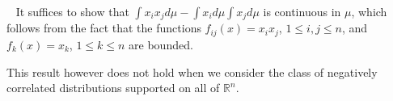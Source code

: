 \documentclass[11pt]{article}
\newcommand{\R}{\mathbb{R}}
\newenvironment{Proof}{\noindent{\bf Proof} \ }{\QED}\smallskip
\newcommand\QED{\newline \rightline{$\blacksquare$} \bigskip}
\begin{document}
\begin{Proof}
It suffices to show that $\int x_ix_j d\mu-\int x_i d\mu\int x_jd\mu$ is continuous in $\mu$, which follows from the fact that the functions $f_{ij}(x) = x_ix_j$, $1\leq i,j\leq n$,
and $f_k(x) = x_k$, $1\leq k\leq n$ are bounded.
 \end{Proof}
 
 This result however does not hold when we consider the class of negatively correlated distributions supported on all of $\R^n$. 
\end{document}
